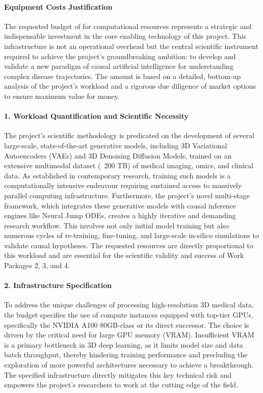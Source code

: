 \paragraph{Equipment Costs Justification}
The requested budget of  for computational resources represents a strategic and indispensable investment in the core enabling technology of this project. This infrastructure is not an operational overhead but the central scientific instrument required to achieve the project's groundbreaking ambition: to develop and validate a new paradigm of causal artificial intelligence for understanding complex disease trajectories. The amount is based on a detailed, bottom-up analysis of the project's workload and a rigorous due diligence of market options to ensure maximum value for money.

\paragraph{1. Workload Quantification and Scientific Necessity}
The project's scientific methodology is predicated on the development of several large-scale, state-of-the-art generative models, including 3D Variational Autoencoders (VAEs) and 3D Denoising Diffusion Models, trained on an extensive multimodal dataset (~200 TB) of medical imaging, omics, and clinical data. As established in contemporary research, training such models is a computationally intensive endeavour requiring sustained access to massively parallel computing infrastructure. Furthermore, the project's novel multi-stage framework, which integrates these generative models with causal inference engines like Neural Jump ODEs, creates a highly iterative and demanding research workflow. This involves not only initial model training but also numerous cycles of re-training, fine-tuning, and large-scale in-silico simulations to validate causal hypotheses. The requested resources are directly proportional to this workload and are essential for the scientific validity and success of Work Packages 2, 3, and 4.

\paragraph{2. Infrastructure Specification}
To address the unique challenges of processing high-resolution 3D medical data, the budget specifies the use of compute instances equipped with top-tier GPUs, specifically the NVIDIA A100 80GB-class or its direct successor. The choice is driven by the critical need for large GPU memory (VRAM). Insufficient VRAM is a primary bottleneck in 3D deep learning, as it limits model size and data batch throughput, thereby hindering training performance and precluding the exploration of more powerful architectures necessary to achieve a breakthrough. The specified infrastructure directly mitigates this key technical risk and empowers the project's researchers to work at the cutting edge of the field.


